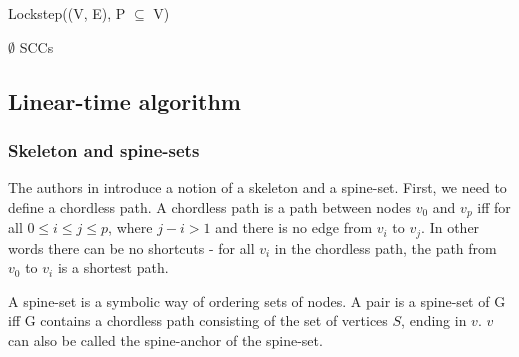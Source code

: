 \documentclass[../master/master.tex]{subfiles}
\begin{document}
\begin{algorithm}[H]
  \caption{Lockstep((V, E), P $\subseteq$ V)}
  \begin{algorithmic}[1]
    \Statex
     \State \Return $\emptyset$
    \EndIf
    \Statex
    \Statex
    \EndWhile
    \Statex
    \Else
    \EndIf
    \Statex
    \EndWhile
    \Statex
    \State \Return SCCs
  \end{algorithmic}
\end{algorithm}

\subsection{Linear-time algorithm}
\subsubsection{Skeleton and spine-sets}
The authors in \cite{linear} introduce a notion of a skeleton and a spine-set. First, we need to define a chordless path. A chordless path is a path between nodes $v_0$ and $v_p$ iff for all $0\leq i \leq j \leq p$, where $j-i>1$ and there is no edge from $v_i$ to $v_j$. In other words there can be no shortcuts - for all $v_i$ in the chordless path, the path from $v_0$ to $v_i$ is a shortest path.

A spine-set is a symbolic way of ordering sets of nodes. A pair  is a spine-set of G iff G contains a chordless path consisting of the set of vertices $S$, ending in $v$. $v$ can also be called the spine-anchor of the spine-set.
\end{document}
